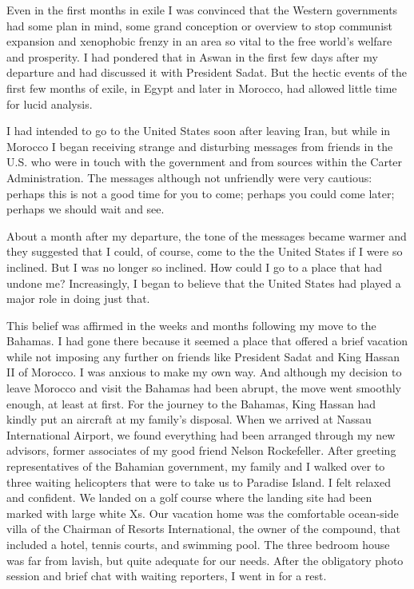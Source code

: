 Even in the first months in exile I was convinced that the Western governments had some plan in mind, some grand conception or overview to stop communist expansion and xenophobic frenzy in an area so vital to the free world’s welfare and prosperity. I had pondered that in Aswan in the first few days after my departure and had discussed it with President Sadat. But the hectic events of the first few months of exile, in Egypt and later in Morocco, had allowed little time for lucid analysis. 

I had intended to go to the United States soon after leaving Iran, but while in Morocco I began receiving strange and disturbing messages from friends in the U.S. who were in touch with the government and from sources within the Carter Administration. The messages although not unfriendly were very cautious: perhaps this is not a good time for you to come; perhaps you could come later; perhaps we should wait and see. 

About a month after my departure, the tone of the messages became warmer and they suggested that I could, of course, come to the the United States if I were so inclined. But I was no longer so inclined. How could I go to a place that had undone me? Increasingly, I began to believe that the United States had played a major role in doing just that. 

This belief was affirmed in the weeks and months following my move to the Bahamas. I had gone there because it seemed a place that offered a brief vacation while not imposing any further on friends like President Sadat and King Hassan II of Morocco. I was anxious to make my own way. And although my decision to leave Morocco and visit the Bahamas had been abrupt, the move went smoothly enough, at least at first. For the journey to the Bahamas, King Hassan had kindly put an aircraft at my family's disposal. When we arrived at Nassau International Airport, we found everything had been arranged through my new advisors, former associates of my good friend Nelson Rockefeller. After greeting representatives of the Bahamian government, my family and I walked over to three waiting helicopters that were to take us to Paradise Island. I felt relaxed and confident. We landed on a golf course where the landing site had been marked with large white Xs. Our vacation home was the comfortable ocean-side villa of the Chairman of Resorts International, the owner of the compound, that included a hotel, tennis courts, and swimming pool. The three bedroom house was far from lavish, but quite adequate for our needs. After the obligatory photo session and brief chat with waiting reporters, I went in for a rest. 

